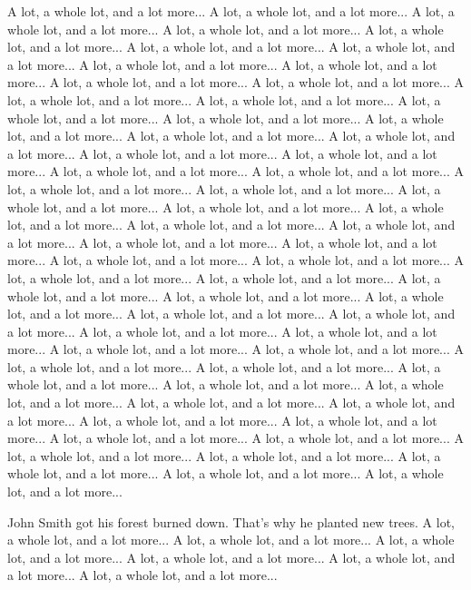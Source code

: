 \documentclass[a0,portrait]{a0poster}
\begin{document}
\begin{poster}
\begin{multicols}{2}
 A lot, a whole lot, and a lot more... A lot, a whole lot, and a lot more... A lot, a whole lot, and a lot more... A lot, a whole lot, and a lot more... A lot, a whole lot, and a lot more... A lot, a whole lot, and a lot more... A lot, a whole lot, and a lot more... A lot, a whole lot, and a lot more... A lot, a whole lot, and a lot more... A lot, a whole lot, and a lot more... A lot, a whole lot, and a lot more... A lot, a whole lot, and a lot more... A lot, a whole lot, and a lot more... A lot, a whole lot, and a lot more... A lot, a whole lot, and a lot more... A lot, a whole lot, and a lot more... A lot, a whole lot, and a lot more... A lot, a whole lot, and a lot more... A lot, a whole lot, and a lot more... A lot, a whole lot, and a lot more... A lot, a whole lot, and a lot more... A lot, a whole lot, and a lot more... A lot, a whole lot, and a lot more... A lot, a whole lot, and a lot more... A lot, a whole lot, and a lot more... A lot, a whole lot, and a lot more... A lot, a whole lot, and a lot more... A lot, a whole lot, and a lot more... A lot, a whole lot, and a lot more... A lot, a whole lot, and a lot more... A lot, a whole lot, and a lot more... A lot, a whole lot, and a lot more... A lot, a whole lot, and a lot more... A lot, a whole lot, and a lot more... A lot, a whole lot, and a lot more... A lot, a whole lot, and a lot more... A lot, a whole lot, and a lot more... A lot, a whole lot, and a lot more... A lot, a whole lot, and a lot more... A lot, a whole lot, and a lot more... A lot, a whole lot, and a lot more... A lot, a whole lot, and a lot more... A lot, a whole lot, and a lot more... A lot, a whole lot, and a lot more... A lot, a whole lot, and a lot more... A lot, a whole lot, and a lot more... A lot, a whole lot, and a lot more... A lot, a whole lot, and a lot more... A lot, a whole lot, and a lot more... A lot, a whole lot, and a lot more... A lot, a whole lot, and a lot more... A lot, a whole lot, and a lot more... A lot, a whole lot, and a lot more... A lot, a whole lot, and a lot more... A lot, a whole lot, and a lot more... A lot, a whole lot, and a lot more... A lot, a whole lot, and a lot more... A lot, a whole lot, and a lot more... A lot, a whole lot, and a lot more... A lot, a whole lot, and a lot more...

\newpage

John Smith got his forest burned down.
That's why he planted new trees.
A lot, a whole lot, and a lot more...
A lot, a whole lot, and a lot more...
A lot, a whole lot, and a lot more...
A lot, a whole lot, and a lot more...
A lot, a whole lot, and a lot more...
A lot, a whole lot, and a lot more...



\end{multicols}
\end{poster}
\end{document}
